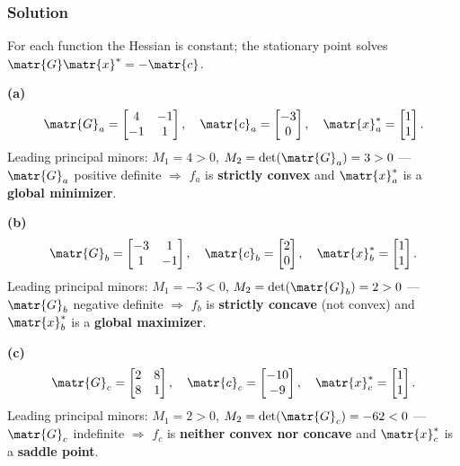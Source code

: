 \subsubsection*{Solution}

For each function the Hessian is constant; the stationary point solves
$\matr{G}\matr{x}^* = -\matr{c}$.

\medskip\noindent\textbf{(a)}
\begin{equation*}
  \matr{G}_a = \begin{bmatrix} 4 & -1 \\ -1 & 1 \end{bmatrix}, \quad
  \matr{c}_a = \begin{bmatrix} -3 \\ 0 \end{bmatrix}, \quad
  \matr{x}^*_a = \begin{bmatrix} 1 \\ 1 \end{bmatrix}.
\end{equation*}
Leading principal minors: $M_1 = 4 > 0$, $M_2 = \det(\matr{G}_a) = 3 > 0$ ---
$\matr{G}_a$ positive definite $\Rightarrow$ $f_a$ is \textbf{strictly convex} and
$\matr{x}^*_a$ is a \textbf{global minimizer}.

\medskip\noindent\textbf{(b)}
\begin{equation*}
  \matr{G}_b = \begin{bmatrix} -3 & 1 \\ 1 & -1 \end{bmatrix}, \quad
  \matr{c}_b = \begin{bmatrix} 2 \\ 0 \end{bmatrix}, \quad
  \matr{x}^*_b = \begin{bmatrix} 1 \\ 1 \end{bmatrix}.
\end{equation*}
Leading principal minors: $M_1 = -3 < 0$, $M_2 = \det(\matr{G}_b) = 2 > 0$ ---
$\matr{G}_b$ negative definite $\Rightarrow$ $f_b$ is \textbf{strictly concave} (not convex) and
$\matr{x}^*_b$ is a \textbf{global maximizer}.

\medskip\noindent\textbf{(c)}
\begin{equation*}
  \matr{G}_c = \begin{bmatrix} 2 & 8 \\ 8 & 1 \end{bmatrix}, \quad
  \matr{c}_c = \begin{bmatrix} -10 \\ -9 \end{bmatrix}, \quad
  \matr{x}^*_c = \begin{bmatrix} 1 \\ 1 \end{bmatrix}.
\end{equation*}
Leading principal minors: $M_1 = 2 > 0$, $M_2 = \det(\matr{G}_c) = -62 < 0$ ---
$\matr{G}_c$ indefinite $\Rightarrow$ $f_c$ is \textbf{neither convex nor concave} and
$\matr{x}^*_c$ is a \textbf{saddle point}.


